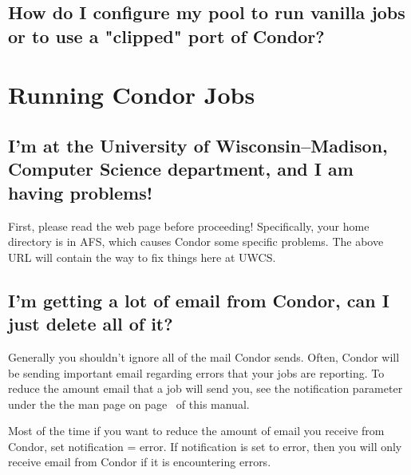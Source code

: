 \Todo

\subsection{How do I configure my pool to run vanilla jobs or to use a "clipped" port of Condor?}

\Todo

\section{Running Condor Jobs}


\subsection{I'm at the University of Wisconsin--Madison, Computer Science department, and I am having problems!}

First, please read the web page  before proceeding!
Specifically, your home directory is in AFS, which causes Condor some specific problems.
The above URL will contain the way to fix things here at UWCS.

\subsection{I'm getting a lot of email from Condor, can I just delete all of it?}

Generally you shouldn't ignore all of the mail Condor sends.  Often,
Condor will be sending important email regarding errors that your
jobs are reporting.  To reduce the amount email that a job will send
you, see the notification parameter under the the  man page
on page~\pageref{man-condor-submit-notification} of this manual.

Most of the time if you want to reduce the amount of email you receive
from Condor, set notification = error.  If notification is set to
error, then you will only receive email from Condor if it is encountering
errors.

